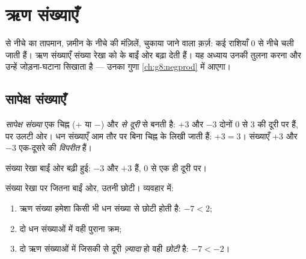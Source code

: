 \chapter{ऋण संख्याएँ}\label{ch:g7:negatives}

 से नीचे का तापमान, ज़मीन के नीचे की मंज़िलें, चुकाया जाने
वाला क़र्ज़: कई राशियाँ $0$ से नीचे चली जाती हैं। ऋण संख्याएँ
संख्या रेखा को  के बाईं ओर बढ़ा देती हैं। यह अध्याय उनकी
तुलना करना और उन्हें जोड़ना-घटाना सिखाता है --- उनका गुणा
\cref{ch:g8:negprod} में आएगा।

\section{सापेक्ष संख्याएँ}

\begin{definition}[सापेक्ष संख्याएँ]\label{def:g7:negatives:def}
\emph{सापेक्ष संख्या} एक चिह्न
($+$ या $-$) और \emph{ से दूरी} से बनती है: $+3$ और $-3$
दोनों $0$ से $3$ की दूरी पर हैं, पर उलटी ओर। धन संख्याएँ आम तौर
पर बिना चिह्न के लिखी जाती हैं: $+3 = 3$। संख्याएँ $+3$ और $-3$
एक-दूसरे की \emph{विपरीत} हैं।
\end{definition}

\begin{omfigure}

{\small संख्या रेखा बाईं ओर बढ़ी हुई: $-3$ और $+3$  हैं, $0$ से एक ही दूरी पर।}
\end{omfigure}

\begin{method}[सापेक्ष संख्याओं की तुलना]\label{met:g7:negatives:compare}
संख्या रेखा पर जितना बाईं ओर, उतनी छोटी। व्यवहार में:
\begin{enumerate}
  \item ऋण संख्या हमेशा किसी भी धन संख्या से छोटी होती है:
        $-7 < 2$;
  \item दो धन संख्याओं में वही पुराना क्रम;
  \item दो ऋण संख्याओं में जिसकी  से दूरी \emph{ज़्यादा} हो
        वही \emph{छोटी} है: $-7 < -2$।
\end{enumerate}
\end{method}

